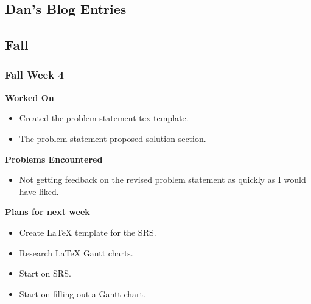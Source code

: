 \documentclass[compsoc,draftclsnofoot,onecolumn,10pt]{IEEEtran}
\begin{document}
\subsection{Dan's Blog Entries}

\subsection{Fall}
\subsubsection*{Fall Week 4}
\textbf{Worked On}
\begin{itemize}
    \item Created the problem statement tex template.
    \item The problem statement proposed solution section.
\end{itemize}
\textbf{Problems Encountered}
\begin{itemize}
    \item Not getting feedback on the revised problem statement as quickly as I would have liked.
\end{itemize}
\textbf{Plans for next week}
\begin{itemize}
    \item Create LaTeX template for the SRS.
    \item Research LaTeX Gantt charts.
    \item Start on SRS.
    \item Start on filling out a Gantt chart.
\end{itemize}
\end{document}
